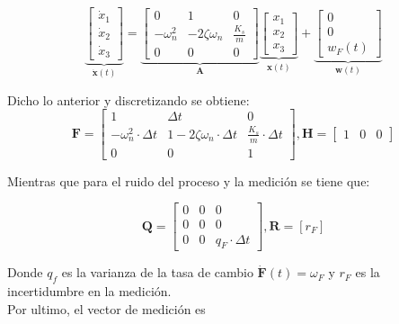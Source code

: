 \documentclass[conference]{IEEEtran}
\begin{document}
\begin{equation*}
	\underbrace{
		\begin{bmatrix}
			\dot{x}_1 \\
			\dot{x}_2 \\
			\dot{x}_3
		\end{bmatrix}
	}_{\mathbf{\dot{x}}(t)}
	=
	\underbrace{\begin{bmatrix}
			0           & 1                & 0 \\
			-\omega_n^2 & -2\zeta\omega_n  &  \frac{K_s}{m} \\
			0			& 0				   & 0
	\end{bmatrix}}_{\mathbf{A}}
	\underbrace{\begin{bmatrix}
			x_1 \\
			x_2 \\
			x_3
	\end{bmatrix}}_{\mathbf{x}(t)}	
	+
	\underbrace{
	\begin{bmatrix}
		0 \\
		0 \\
		w_{F}(t)
	\end{bmatrix}
	}_{\mathbf{w}(t)}	
\end{equation*}

Dicho lo anterior y discretizando se obtiene:
\[
\mathbf{F} = 
\begin{bmatrix}
	1           & \Delta t            & 0 \\
	-\omega_n^2 \cdot \Delta t   & 1 -2\zeta\omega_n \cdot \Delta t   &  \frac{K_s}{m} \cdot \Delta t  \\
	0			& 0				   & 1
\end{bmatrix}, 
\mathbf{H} = 
\begin{bmatrix}
	1 & 0 & 0
\end{bmatrix}
\]


Mientras que para el ruido del proceso y la medición se tiene que:


\[
\mathbf{Q} =  \begin{bmatrix}
	0   & 0    & 0 \\
	0   & 0    & 0  \\
	0   & 0	   & q_F \cdot \Delta t
\end{bmatrix}, \mathbf{R} = [r_F]
\]

Donde $q_f$ es la varianza de la tasa de cambio $\mathbf{\dot{F}}(t) = \omega_{F}$ y $r_F$ es la incertidumbre en la medici\'on.\\

Por ultimo, el vector de medición es
\end{document}
